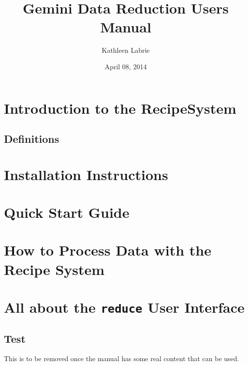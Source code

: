 \documentclass[letterpaper,10pt,english]{sphinxmanual}
\title{Gemini Data Reduction Users Manual}
\date{April 08, 2014}
\author{Kathleen Labrie}
\begin{document}
\maketitle
\tableofcontents
{}\label{index-latex::doc}



\chapter{Introduction to the RecipeSystem}
\label{RecipeSystem/intro:introduction-to-the-recipesystem}\label{RecipeSystem/intro:gemini-data-reduction-users-manual}\label{RecipeSystem/intro::doc}

\section{Definitions}
\label{RecipeSystem/intro:definitions}

\chapter{Installation Instructions}
\label{RecipeSystem/installation::doc}\label{RecipeSystem/installation:installation-instructions}

\chapter{Quick Start Guide}
\label{RecipeSystem/quickstart:quick-start-guide}\label{RecipeSystem/quickstart::doc}

\chapter{How to Process Data with the Recipe System}
\label{RecipeSystem/usage::doc}\label{RecipeSystem/usage:how-to-process-data-with-the-recipe-system}

\chapter{All about the  \texttt{reduce} User Interface}
\label{RecipeSystem/reduce:all-about-the-reduce-user-interface}\label{RecipeSystem/reduce::doc}

\section{Test}
\label{RecipeSystem/test:test}\label{RecipeSystem/test::doc}
This is to be removed once the  manual has some real content that can be used.
\end{document}
